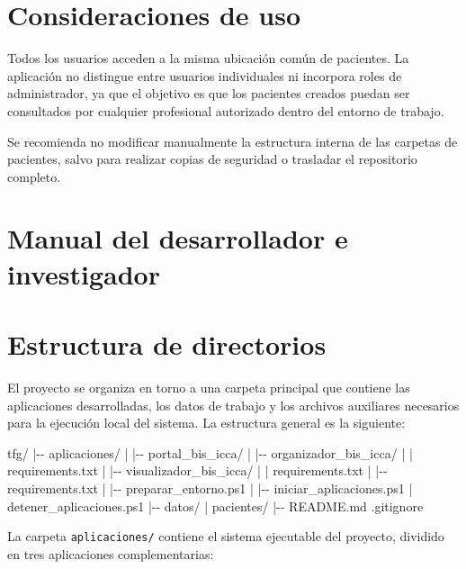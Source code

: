 \documentclass[
  spanish,
  a4paper,
  12pt,
  twoside]{memoir}
\newenvironment{Shaded}{\begin{snugshade}}{\end{snugshade}}
\newcommand{\NormalTok}[1]{\textcolor[rgb]{0.00,0.23,0.31}{#1}}
\newcommand{\apendice}[1]{\chapter{#1}}
\begin{document}
\chapter{Consideraciones de uso}\label{consideraciones-de-uso}

Todos los usuarios acceden a la misma ubicación común de pacientes. La
aplicación no distingue entre usuarios individuales ni incorpora roles
de administrador, ya que el objetivo es que los pacientes creados puedan
ser consultados por cualquier profesional autorizado dentro del entorno
de trabajo.

Se recomienda no modificar manualmente la estructura interna de las
carpetas de pacientes, salvo para realizar copias de seguridad o
trasladar el repositorio completo.


\apendice{Manual del desarrollador e investigador}

\chapter{Estructura de directorios}\label{estructura-de-directorios}

El proyecto se organiza en torno a una carpeta principal que contiene
las aplicaciones desarrolladas, los datos de trabajo y los archivos
auxiliares necesarios para la ejecución local del sistema. La estructura
general es la siguiente:

\begin{Shaded}
\begin{Highlighting}[]
\NormalTok{tfg/}
\NormalTok{|{-}{-} aplicaciones/}
\NormalTok{|   |{-}{-} portal\_bis\_icca/}
\NormalTok{|   |{-}{-} organizador\_bis\_icca/}
\NormalTok{|   |   \textasciigrave{}{-}{-} requirements.txt}
\NormalTok{|   |{-}{-} visualizador\_bis\_icca/}
\NormalTok{|   |   \textasciigrave{}{-}{-} requirements.txt}
\NormalTok{|   |{-}{-} requirements.txt}
\NormalTok{|   |{-}{-} preparar\_entorno.ps1}
\NormalTok{|   |{-}{-} iniciar\_aplicaciones.ps1}
\NormalTok{|   \textasciigrave{}{-}{-} detener\_aplicaciones.ps1}
\NormalTok{|{-}{-} datos/}
\NormalTok{|   \textasciigrave{}{-}{-} pacientes/}
\NormalTok{|{-}{-} README.md}
\NormalTok{\textasciigrave{}{-}{-} .gitignore}
\end{Highlighting}
\end{Shaded}

La carpeta \texttt{aplicaciones/} contiene el sistema ejecutable del
proyecto, dividido en tres aplicaciones complementarias:
\end{document}
